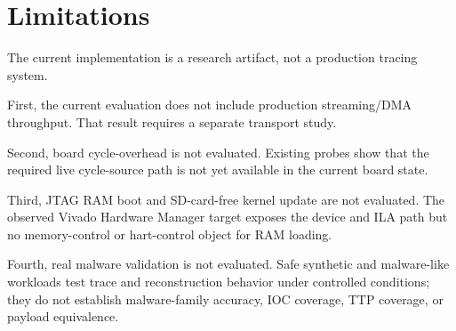 \section{Limitations}

The current implementation is a research artifact, not a production tracing
system.

First, the current evaluation does not include production streaming/DMA
throughput. That result requires a separate transport study.

Second, board cycle-overhead is not evaluated. Existing probes show that the
required live cycle-source path is not yet available in the current board
state.

Third, JTAG RAM boot and SD-card-free kernel update are not evaluated. The
observed Vivado Hardware Manager target exposes the device and ILA path but no
memory-control or hart-control object for RAM loading.

Fourth, real malware validation is not evaluated. Safe synthetic and
malware-like workloads test trace and reconstruction behavior under controlled
conditions; they do not establish malware-family accuracy, IOC coverage, TTP
coverage, or payload equivalence.

